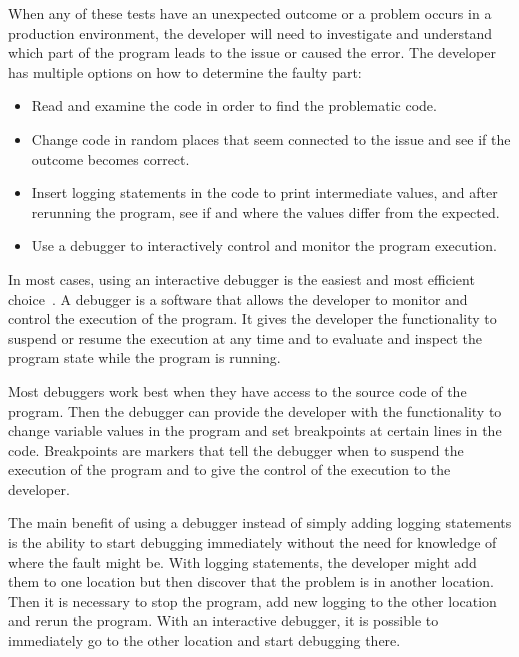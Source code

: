 \documentclass[..thesis.tex]{subfiles}
\begin{document}
When any of these tests have an unexpected outcome or a problem occurs in a production environment, the developer will need to investigate and understand which part of the program leads to the issue or caused the error.
The developer has multiple options on how to determine the faulty part:
\begin{itemize}
  \item Read and examine the code in order to find the problematic code.
  \item Change code in random places that seem connected to the issue and see if the outcome becomes correct.
  \item Insert logging statements in the code to print intermediate values, and after rerunning the program, see if and where the values differ from the expected.
  \item Use a debugger to interactively control and monitor the program execution.
\end{itemize}

In most cases, using an interactive debugger is the easiest and most efficient choice~\cite{debug_tools}.
A debugger is a software that allows the developer to monitor and control the execution of the program.
% 
% 
It gives the developer the functionality to suspend or resume the execution at any time and to evaluate and inspect the program state while the program is running. 

Most debuggers work best when they have access to the source code of the program. 
Then the debugger can provide the developer with the functionality to change variable values in the program and set breakpoints at certain lines in the code. 
Breakpoints are markers that tell the debugger when to suspend the execution of the program and to give the control of the execution to the developer.

The main benefit of using a debugger instead of simply adding logging statements is the ability to start debugging immediately without the need for knowledge of where the fault might be.
With logging statements, the developer might add them to one location but then discover that the problem is in another location. 
Then it is necessary to stop the program, add new logging to the other location and rerun the program.
With an interactive debugger, it is possible to immediately go to the other location and start debugging there.
\end{document}
